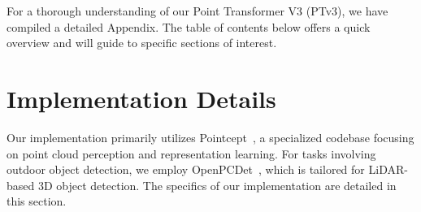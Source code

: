 For a thorough understanding of our Point Transformer V3 (PTv3), we have compiled a detailed Appendix. The table of contents below offers a quick overview and will guide to specific sections of interest.

\hypersetup{linkbordercolor=black,linkcolor=black}

\setlength{\cftbeforesecskip}{0.5em}

\localtableofcontents
\hypersetup{linkbordercolor=red,linkcolor=red}

\section{Implementation Details}
Our implementation primarily utilizes Pointcept~\cite{pointcept2023}, a specialized codebase focusing on point cloud perception and representation learning. For tasks involving outdoor object detection, we employ OpenPCDet~\cite{openpcdet2020}, which is tailored for LiDAR-based 3D object detection. The specifics of our implementation are detailed in this section.

\begin{table}[!t]
    \begin{minipage}{0.48\textwidth}
    \centering
        
        \vspace{-3mm}
        \caption{\textbf{Indoor semantic segmentation settings.} }\label{tab:indoor_sem_seg_settings}
        \vspace{2mm}
    \end{minipage}
    \begin{minipage}{0.48\textwidth}
    \centering
        
        \vspace{-3mm}
        \caption{\textbf{Outdoor semantic segmentation settings.} }\label{tab:outdoor_sem_seg_settings}
        \vspace{2mm}
    \end{minipage}
    \begin{minipage}{0.48\textwidth}
    \centering
        
        \vspace{-3mm}
        \caption{\textbf{Other downstream tasks settings.} }\label{tab:other_downstream_tasks_settings}
        \vspace{-4mm}
    \end{minipage}
\end{table}

